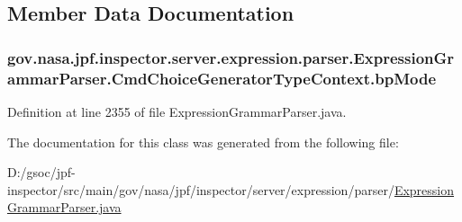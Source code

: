 \subsection{Member Data Documentation}
\subsubsection[{\texorpdfstring{bp\+Mode}{bpMode}}]{ gov.\+nasa.\+jpf.\+inspector.\+server.\+expression.\+parser.\+Expression\+Grammar\+Parser.\+Cmd\+Choice\+Generator\+Type\+Context.\+bp\+Mode}\hypertarget{classgov_1_1nasa_1_1jpf_1_1inspector_1_1server_1_1expression_1_1parser_1_1_expression_grammar_pa25195f4046c6a14884faf2c870f5b76d_ad311909f73e08a42946a5e9f4dab7ce8}{}\label{classgov_1_1nasa_1_1jpf_1_1inspector_1_1server_1_1expression_1_1parser_1_1_expression_grammar_pa25195f4046c6a14884faf2c870f5b76d_ad311909f73e08a42946a5e9f4dab7ce8}


Definition at line 2355 of file Expression\+Grammar\+Parser.\+java.



The documentation for this class was generated from the following file\+:\begin{DoxyCompactItemize}
\item 
D\+:/gsoc/jpf-\/inspector/src/main/gov/nasa/jpf/inspector/server/expression/parser/\hyperlink{_expression_grammar_parser_8java}{Expression\+Grammar\+Parser.\+java}\end{DoxyCompactItemize}

